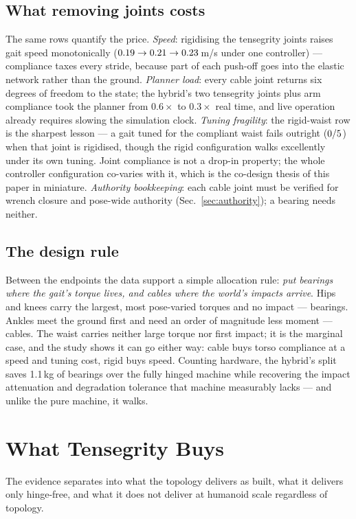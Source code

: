\documentclass[conference]{IEEEtran}
\begin{document}
\subsection{What removing joints costs}
The same rows quantify the price. \emph{Speed}: rigidising the tensegrity
joints raises gait speed monotonically ($0.19 \rightarrow
0.21 \rightarrow 0.23$\,m/s under one controller) --- compliance
taxes every stride, because part of each push-off goes into the elastic
network rather than the ground. \emph{Planner load}: every cable joint
returns six degrees of freedom to the state; the hybrid's two tensegrity
joints plus arm compliance took the planner from $0.6\times$ to $0.3\times$
real time, and live operation already requires slowing the simulation clock.
\emph{Tuning fragility}: the rigid-waist row is the sharpest lesson --- a
gait tuned for the compliant waist fails outright ($0/5$) when
that joint is rigidised, though the rigid configuration walks excellently
under its own tuning. Joint compliance is not a drop-in property; the whole
controller configuration co-varies with it, which is the co-design thesis of
this paper in miniature. \emph{Authority bookkeeping}: each cable joint must
be verified for wrench closure and pose-wide authority (Sec.~\ref{sec:authority});
a bearing needs neither.

\subsection{The design rule}
Between the endpoints the data support a simple allocation rule: \emph{put
bearings where the gait's torque lives, and cables where the world's impacts
arrive}. Hips and knees carry the largest, most pose-varied torques and no
impact --- bearings. Ankles meet the ground first and need an order of
magnitude less moment --- cables. The waist carries neither large torque nor
first impact; it is the marginal case, and the study shows it can go either
way: cable buys torso compliance at a speed and tuning cost, rigid buys
speed. Counting hardware, the hybrid's split saves 1.1\,kg of bearings over
the fully hinged machine while recovering the impact attenuation and
degradation tolerance that machine measurably lacks --- and unlike the pure
machine, it walks.

\section{What Tensegrity Buys}
\label{sec:buys}
The evidence separates into what the topology delivers as built, what it
delivers only hinge-free, and what it does not deliver at humanoid scale
regardless of topology.
\end{document}
